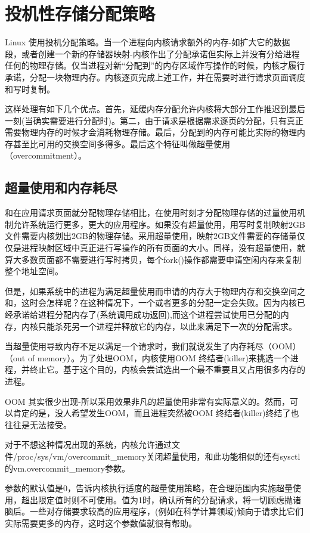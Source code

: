 \section{投机性存储分配策略}

Linux 使用投机分配策略。当一个进程向内核请求额外的内存-如扩大它的数据段，或者创建一个新的存储器映射-内核作出了分配承诺但实际上并没有分给进程任何的物理存储。仅当进程对新“分配到”的内存区域作写操作的时候，内核才履行承诺，分配一块物理内存。内核逐页完成上述工作，并在需要时进行请求页面调度和写时复制。

这样处理有如下几个优点。首先，延缓内存分配允许内核将大部分工作推迟到最后一刻(当确实需要进行分配时)。第二，由于请求是根据需求逐页的分配，只有真正需要物理内存的时候才会消耗物理存储。最后，分配到的内存可能比实际的物理内存甚至比可用的交换空间多得多。最后这个特征叫做超量使用（overcommitment）。 

\subsection{超量使用和内存耗尽}

和在应用请求页面就分配物理存储相比，在使用时刻才分配物理存储的过量使用机制允许系统运行更多，更大的应用程序。如果没有超量使用，用写时复制映射2GB文件需要内核划出2GB的物理存储。采用超量使用，映射2GB文件需要的存储量仅仅是进程映射区域中真正进行写操作的所有页面的大小。同样，没有超量使用，就算大多数页面都不需要进行写时拷贝，每个fork()操作都需要申请空闲内存来复制整个地址空间。

但是，如果系统中的进程为满足超量使用而申请的内存大于物理内存和交换空间之和，这时会怎样呢？在这种情况下，一个或者更多的分配一定会失败。因为内核已经承诺给进程分配内存了(系统调用成功返回),而这个进程尝试使用已分配的内存，内核只能杀死另一个进程并释放它的内存，以此来满足下一次的分配需求。

当超量使用导致内存不足以满足一个请求时，我们就说发生了内存耗尽（OOM）（out of memory）。为了处理OOM，内核使用OOM 终结者(killer)来挑选一个进程，并终止它。基于这个目的，内核会尝试选出一个最不重要且又占用很多内存的进程。

OOM 其实很少出现-所以采用效果非凡的超量使用非常有实际意义的。然而，可以肯定的是，没人希望发生OOM，而且进程突然被OOM 终结者(killer)终结了也往往是无法接受。

对于不想这种情况出现的系统，内核允许通过文件/proc/sys/vm/overcommit\_memory关闭超量使用，和此功能相似的还有sysctl的vm.overcommit\_memory参数。

参数的默认值是0，告诉内核执行适度的超量使用策略，在合理范围内实施超量使用，超出限定值时则不可使用。值为1时，确认所有的分配请求，将一切顾虑抛诸脑后。一些对存储要求较高的应用程序，(例如在科学计算领域)倾向于请求比它们实际需要更多的内存，这时这个参数值就很有帮助。

